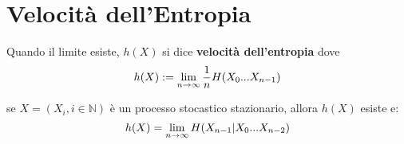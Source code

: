 \vspace{15pt}


\section{Velocità dell'Entropia}
\label{sec:EntropyRate}
\vspace{10pt}

\begin{defi}
Quando il limite esiste, $h(X)$ si dice \textbf{velocità dell'entropia} dove
$$h(X):=\lim_{n\to \infty}\frac{1}{n}H(X_0...X_{n-1})$$
\end{defi}

\begin{teo}\label{teo:10.10}
se $X=(X_i,i\in \mathbb{N})$ è un processo stocastico stazionario, allora $h(X)$ esiste e:
\begin{equation} \label{eq3}
h(X)=\lim_{n\to \infty} H(X_{n-1}|X_0...X_{n-2})
\end{equation}
\end{teo}
